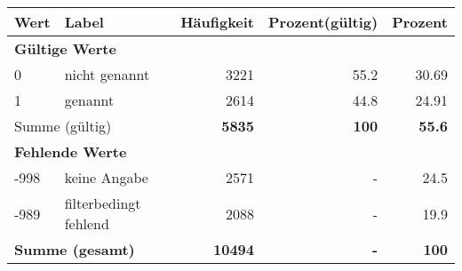      \begin{longtable}{lXrrr}
     \toprule
     \textbf{Wert} & \textbf{Label} & \textbf{Häufigkeit} & \textbf{Prozent(gültig)} & \textbf{Prozent} \\
     \endhead
     \midrule
     \multicolumn{5}{l}{\textbf{Gültige Werte}}\\

     0 &
     \multicolumn{1}{X}{ nicht genannt   } &


       \num{3221} &
       \num[round-mode=places,round-precision=2]{55,2} &
         \num[round-mode=places,round-precision=2]{30,69} \\

     1 &
     \multicolumn{1}{X}{ genannt   } &


       \num{2614} &
       \num[round-mode=places,round-precision=2]{44,8} &
         \num[round-mode=places,round-precision=2]{24,91} \\
     \midrule
     \multicolumn{2}{l}{Summe (gültig)} &
       \textbf{\num{5835}} &
     \textbf{100} &
       \textbf{\num[round-mode=places,round-precision=2]{55,6}} \\
     \multicolumn{5}{l}{\textbf{Fehlende Werte}}\\
       -998 &
       keine Angabe &
         \num{2571} &
        - &
         \num[round-mode=places,round-precision=2]{24,5} \\
       -989 &
       filterbedingt fehlend &
         \num{2088} &
        - &
         \num[round-mode=places,round-precision=2]{19,9} \\
     \midrule
     \multicolumn{2}{l}{\textbf{Summe (gesamt)}} &
          \textbf{\num{10494}} &
        \textbf{-} &
        \textbf{100} \\
     \bottomrule
     \end{longtable}
     
